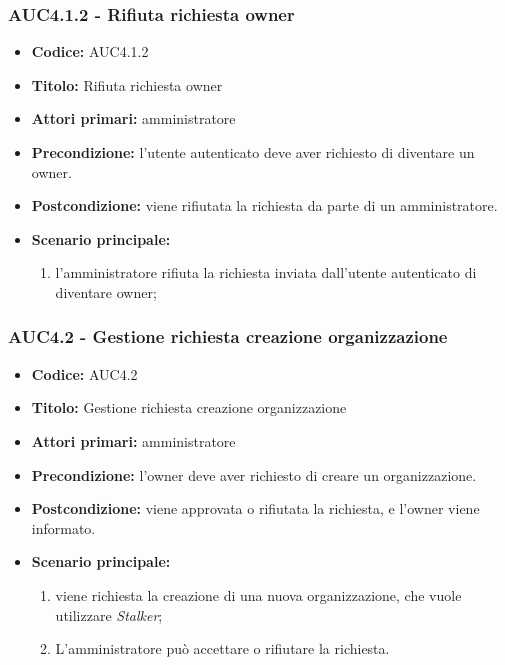 \documentclass[casi-duso]{subfiles}
\begin{document}
\subsubsection{AUC4.1.2 - Rifiuta richiesta owner}%
\label{subsub:AUC4.1.2}
\begin{itemize}
  \item \textbf{Codice:} AUC4.1.2
  \item \textbf{Titolo:} Rifiuta richiesta owner
  \item \textbf{Attori primari:} amministratore
  \item \textbf{Precondizione:} l'utente autenticato deve aver richiesto di diventare un owner.
  \item \textbf{Postcondizione:} viene rifiutata la richiesta da parte di un amministratore.
  \item \textbf{Scenario principale:}
  \begin{enumerate}
    \item l'amministratore rifiuta la richiesta inviata dall'utente autenticato di diventare owner;
  \end{enumerate}
\end{itemize}

\subsubsection{AUC4.2 - Gestione richiesta creazione organizzazione}%
\label{subsub:AUC4.2}
\begin{itemize}
  \item \textbf{Codice:} AUC4.2
  \item \textbf{Titolo:} Gestione richiesta creazione organizzazione
  \item \textbf{Attori primari:} amministratore
  \item \textbf{Precondizione:} l'owner deve aver richiesto di creare un organizzazione.
  \item \textbf{Postcondizione:} viene approvata o rifiutata la richiesta, e l'owner viene informato.
  \item \textbf{Scenario principale:}
  \begin{enumerate}
    \item viene richiesta la creazione di una nuova organizzazione, che vuole utilizzare \emph{Stalker};
    \item L'amministratore può accettare o rifiutare la richiesta.
  \end{enumerate}
\end{itemize}
\end{document}
